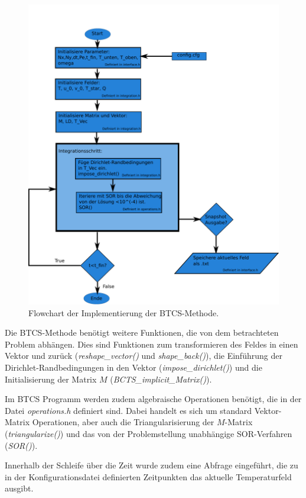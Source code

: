\begin{figure}\centering
\includegraphics[height=0.45\textheight]{BTCSflow.pdf}\caption{Flowchart der Implementierung der BTCS-Methode.}\label{fig:BTCS}
\end{figure}

Die BTCS-Methode benötigt weitere Funktionen, die von dem betrachteten Problem abhängen. Dies sind Funktionen zum transformieren des Feldes in einen Vektor und zurück (\emph{reshape\_vector()} und \emph{shape\_back()}), die Einführung der Dirichlet-Randbedingungen in den Vektor (\emph{impose\_dirichlet()}) und die Initialisierung der Matrix $M$ (\emph{BCTS\_implicit\_Matrix()}).

Im BTCS Programm werden zudem algebraische Operationen benötigt, die in der Datei \emph{operations.h} definiert sind.
Dabei handelt es sich um standard Vektor-Matrix Operationen, aber auch die Triangularisierung der $M$-Matrix (\emph{triangularize()}) und das von der Problemstellung unabhängige SOR-Verfahren (\emph{SOR()}).

Innerhalb der Schleife über die Zeit wurde zudem eine Abfrage eingeführt, die zu in der Konfigurationsdatei definierten Zeitpunkten das aktuelle Temperaturfeld ausgibt.

